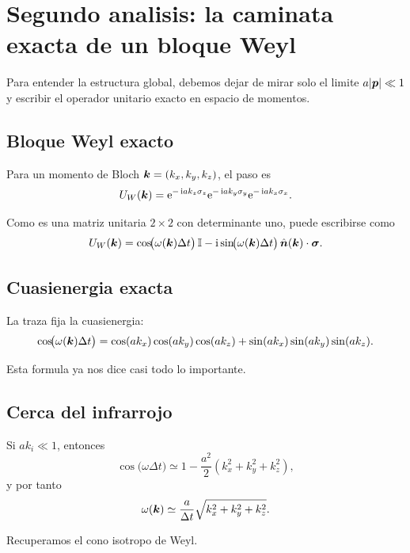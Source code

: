 \section{Segundo analisis: la caminata exacta de un bloque Weyl}
Para entender la estructura global, debemos dejar de mirar solo el limite \(a|\bm{p}|\ll 1\) y escribir el operador unitario exacto en espacio de momentos.

\subsection{Bloque Weyl exacto}
Para un momento de Bloch \(\bm{k}=(k_x,k_y,k_z)\), el paso es
\begin{equation}
U_W(\bm{k})=
\mathrm{e}^{-\,\mathrm{i} a k_z \sigma_z}
\mathrm{e}^{-\,\mathrm{i} a k_y \sigma_y}
\mathrm{e}^{-\,\mathrm{i} a k_x \sigma_x}.
\label{c31:eq:UWk}
\end{equation}

Como es una matriz unitaria \(2\times 2\) con determinante uno, puede escribirse como
\begin{equation}
U_W(\bm{k})=
\cos\!\bigl(\omega(\bm{k})\Delta t\bigr)\,\mathbb{I}
-\mathrm{i} \sin\!\bigl(\omega(\bm{k})\Delta t\bigr)\,\hat{\bm{n}}(\bm{k})\cdot\bm{\sigma}.
\label{c31:eq:SU2form}
\end{equation}

\subsection{Cuasienergia exacta}
La traza fija la cuasienergia:
\begin{equation}
\cos\!\bigl(\omega(\bm{k})\Delta t\bigr)
=
\cos(ak_x)\cos(ak_y)\cos(ak_z)
+ \sin(ak_x)\sin(ak_y)\sin(ak_z).
\label{c31:eq:exactdisp}
\end{equation}

Esta formula ya nos dice casi todo lo importante.

\subsection{Cerca del infrarrojo}
Si \(ak_i\ll 1\), entonces
\begin{equation}
\cos\!\bigl(\omega\Delta t\bigr)
\simeq
1-\frac{a^2}{2}(k_x^2+k_y^2+k_z^2),
\end{equation}
y por tanto
\begin{equation}
\omega(\bm{k})\simeq \frac{a}{\Delta t}\sqrt{k_x^2+k_y^2+k_z^2}.
\end{equation}

Recuperamos el cono isotropo de Weyl.

